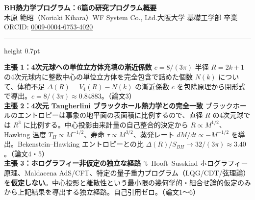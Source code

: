 \documentclass[9pt,a4paper]{ltjsarticle}
\begin{document}
\begin{center}
{\Large\bfseries BH熱力学プログラム：6篇の研究プログラム概要}\\[2pt]
{\small 木原 範昭（Noriaki Kihara）\enspace WF System Co., Ltd.\enspace 大阪大学 基礎工学部 卒業\enspace ORCID: \href{https://orcid.org/0009-0004-6753-4020}{0009-0004-6753-4020}}
\end{center}

\vspace{-1pt}
\hrule height 0.7pt
\vspace{4pt}

\begin{tcolorbox}[colback=gray!7,colframe=gray!55,boxrule=0.4pt,arc=2pt,left=4pt,right=4pt,top=2pt,bottom=2pt]
{\small
\textbf{主張 1：4次元球への単位立方体充填の漸近係数 $c = 8/(3\pi)$}\enspace
半径 $R = 2k+1$ の4次元球内に整数中心の単位立方体を完全包含で詰めた個数 $N(k)$ について、体積不足 $\Delta(R) = V_4(R) - N(k)$ の漸近係数 $c$ を包除原理から閉形式で導出。$c = 8/(3\pi) \approx 0.84883$。{\scriptsize（論文3）}\\[2pt]
\textbf{主張 2：4次元 Tangherlini ブラックホール熱力学との完全一致}\enspace
ブラックホールのエントロピーは事象の地平面の表面積に比例するので、直径 $R$ の4次元球では $R^3$ に比例する。中心投影由来計量の自己整合的決定から $R \propto M^{1/2}$、Hawking 温度 $T_H \propto M^{-1/2}$、寿命 $\tau \propto M^{3/2}$、蒸発レート $dM/dt \propto -M^{-1/2}$ を導出。Bekenstein--Hawking エントロピーとの比 $\Delta(R)/S_{BH} \to 32/(3\pi) \approx 3.40$。{\scriptsize（論文4・5）}\\[2pt]
\textbf{主張 3：ホログラフィー非仮定の独立な経路}\enspace
't~Hooft--Susskind ホログラフィー原理、Maldacena AdS/CFT、特定の量子重力プログラム（LQG/CDT/弦理論）を\textbf{仮定しない}。中心投影と離散性という最小限の幾何学的・組合せ論的仮定のみから上記結果を導出する独立経路。自己引用ゼロ。{\scriptsize（論文1〜6）}}
\end{tcolorbox}

\vspace{2pt}
\end{document}
